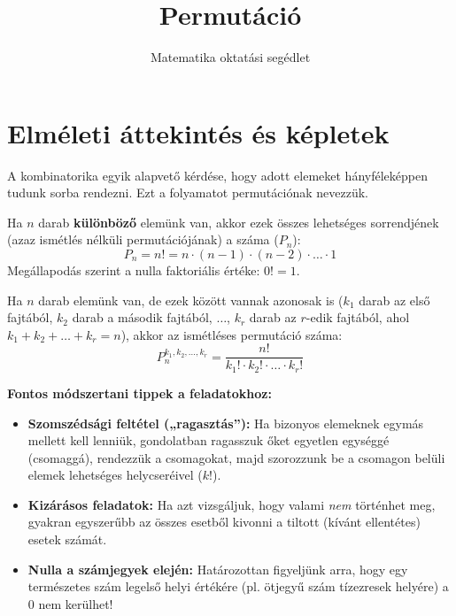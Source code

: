 \documentclass[12pt,a4paper]{article}
\title{Permutáció}
\author{Matematika oktatási segédlet}
\date{}
\begin{document}
\maketitle

\section*{Elméleti áttekintés és képletek}

A kombinatorika egyik alapvető kérdése, hogy adott elemeket hányféleképpen tudunk sorba rendezni. Ezt a folyamatot permutációnak nevezzük.

\begin{tcolorbox}[colback=blue!5,colframe=blue!75!black,title=1. Ismétlés nélküli permutáció]
Ha $n$ darab \textbf{különböző} elemünk van, akkor ezek összes lehetséges sorrendjének (azaz ismétlés nélküli permutációjának) a száma ($P_n$):
\begin{equation}
    P_n = n! = n \cdot (n - 1) \cdot (n - 2) \cdot \dots \cdot 1
\end{equation}
Megállapodás szerint a nulla faktoriális értéke: $0! = 1$.
\end{tcolorbox}

\begin{tcolorbox}[colback=green!5,colframe=green!75!black,title=2. Ismétléses permutáció]
Ha $n$ darab elemünk van, de ezek között vannak azonosak is ($k_1$ darab az első fajtából, $k_2$ darab a második fajtából, $\dots$, $k_r$ darab az $r$-edik fajtából, ahol $k_1 + k_2 + \dots + k_r = n$), akkor az ismétléses permutáció száma:
\begin{equation}
    P_n^{k_1, k_2, \dots, k_r} = \frac{n!}{k_1! \cdot k_2! \cdot \dots \cdot k_r!}
\end{equation}
\end{tcolorbox}

\vspace{0.3cm}
\noindent\textbf{Fontos módszertani tippek a feladatokhoz:}
\begin{itemize}
    \item \textbf{Szomszédsági feltétel („ragasztás”):} Ha bizonyos elemeknek egymás mellett kell lenniük, gondolatban ragasszuk őket egyetlen egységgé (csomaggá), rendezzük a csomagokat, majd szorozzunk be a csomagon belüli elemek lehetséges helycseréivel ($k!$).
    \item \textbf{Kizárásos feladatok:} Ha azt vizsgáljuk, hogy valami \emph{nem} történhet meg, gyakran egyszerűbb az összes esetből kivonni a tiltott (kívánt ellentétes) esetek számát.
    \item \textbf{Nulla a számjegyek elején:} Határozottan figyeljünk arra, hogy egy természetes szám legelső helyi értékére (pl. ötjegyű szám tízezresek helyére) a $0$ nem kerülhet!
\end{itemize}
\end{document}
